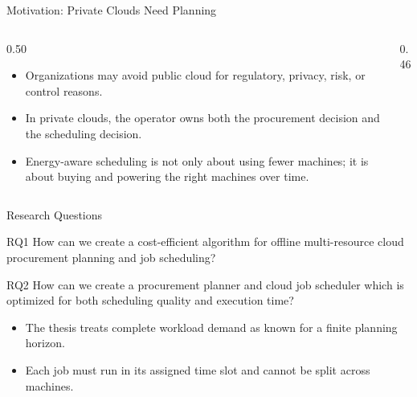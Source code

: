 \documentclass[aspectratio=169,10pt]{beamer}
\begin{document}
\begin{frame}{Motivation: Private Clouds Need Planning}
  \begin{columns}[T,totalwidth=\textwidth]
    \begin{column}{0.50\textwidth}
      \begin{itemize}
        \item Organizations may avoid public cloud for regulatory, privacy, risk, or control reasons.
        \item In private clouds, the operator owns both the procurement decision and the scheduling decision.
        \item Energy-aware scheduling is not only about using fewer machines; it is about buying and powering the right machines over time.
      \end{itemize}
    \end{column}
    \begin{column}{0.46\textwidth}
    \end{column}
  \end{columns}
\end{frame}

\begin{frame}{Research Questions}
  \begin{block}{RQ1}
    How can we create a cost-efficient algorithm for offline multi-resource cloud procurement planning and job scheduling?
  \end{block}
  \begin{block}{RQ2}
    How can we create a procurement planner and cloud job scheduler which is optimized for both scheduling quality and execution time?
  \end{block}
  \vspace{0.25cm}
  \begin{itemize}
    \item The thesis treats complete workload demand as known for a finite planning horizon.
    \item Each job must run in its assigned time slot and cannot be split across machines.
  \end{itemize}
\end{frame}
\end{document}
